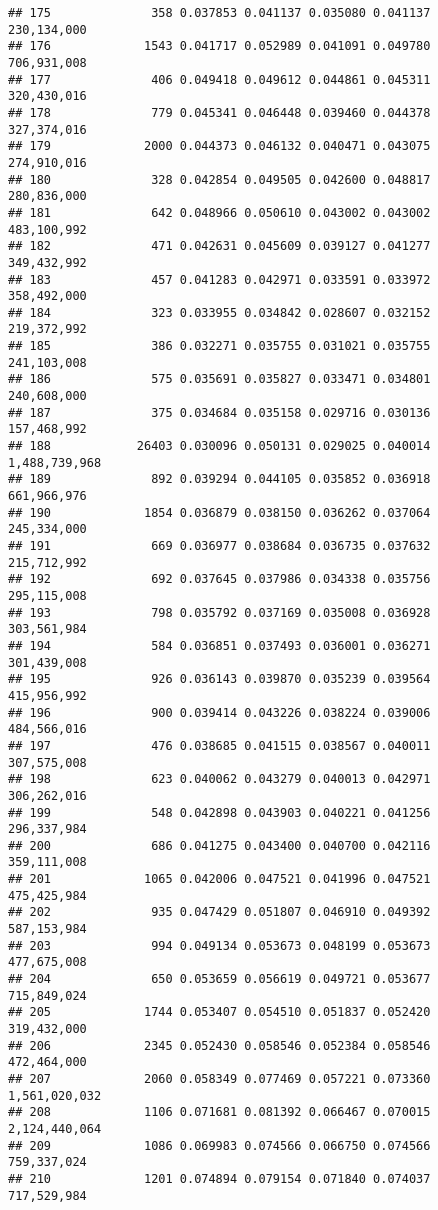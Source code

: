 \documentclass[]{article}
\begin{document}
\begin{verbatim}
## 175              358 0.037853 0.041137 0.035080 0.041137   230,134,000
## 176             1543 0.041717 0.052989 0.041091 0.049780   706,931,008
## 177              406 0.049418 0.049612 0.044861 0.045311   320,430,016
## 178              779 0.045341 0.046448 0.039460 0.044378   327,374,016
## 179             2000 0.044373 0.046132 0.040471 0.043075   274,910,016
## 180              328 0.042854 0.049505 0.042600 0.048817   280,836,000
## 181              642 0.048966 0.050610 0.043002 0.043002   483,100,992
## 182              471 0.042631 0.045609 0.039127 0.041277   349,432,992
## 183              457 0.041283 0.042971 0.033591 0.033972   358,492,000
## 184              323 0.033955 0.034842 0.028607 0.032152   219,372,992
## 185              386 0.032271 0.035755 0.031021 0.035755   241,103,008
## 186              575 0.035691 0.035827 0.033471 0.034801   240,608,000
## 187              375 0.034684 0.035158 0.029716 0.030136   157,468,992
## 188            26403 0.030096 0.050131 0.029025 0.040014 1,488,739,968
## 189              892 0.039294 0.044105 0.035852 0.036918   661,966,976
## 190             1854 0.036879 0.038150 0.036262 0.037064   245,334,000
## 191              669 0.036977 0.038684 0.036735 0.037632   215,712,992
## 192              692 0.037645 0.037986 0.034338 0.035756   295,115,008
## 193              798 0.035792 0.037169 0.035008 0.036928   303,561,984
## 194              584 0.036851 0.037493 0.036001 0.036271   301,439,008
## 195              926 0.036143 0.039870 0.035239 0.039564   415,956,992
## 196              900 0.039414 0.043226 0.038224 0.039006   484,566,016
## 197              476 0.038685 0.041515 0.038567 0.040011   307,575,008
## 198              623 0.040062 0.043279 0.040013 0.042971   306,262,016
## 199              548 0.042898 0.043903 0.040221 0.041256   296,337,984
## 200              686 0.041275 0.043400 0.040700 0.042116   359,111,008
## 201             1065 0.042006 0.047521 0.041996 0.047521   475,425,984
## 202              935 0.047429 0.051807 0.046910 0.049392   587,153,984
## 203              994 0.049134 0.053673 0.048199 0.053673   477,675,008
## 204              650 0.053659 0.056619 0.049721 0.053677   715,849,024
## 205             1744 0.053407 0.054510 0.051837 0.052420   319,432,000
## 206             2345 0.052430 0.058546 0.052384 0.058546   472,464,000
## 207             2060 0.058349 0.077469 0.057221 0.073360 1,561,020,032
## 208             1106 0.071681 0.081392 0.066467 0.070015 2,124,440,064
## 209             1086 0.069983 0.074566 0.066750 0.074566   759,337,024
## 210             1201 0.074894 0.079154 0.071840 0.074037   717,529,984

\end{verbatim}
\end{document}
